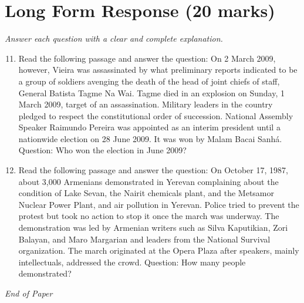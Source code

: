 \documentclass[12pt]{article}
\begin{document}
\section*{Long Form Response (20 marks)}
\textit{Answer each question with a clear and complete explanation.}
\begin{enumerate}[label=\arabic*.]
\setcounter{enumi}{10}
\item Read the following passage and answer the question: On 2 March 2009, however, Vieira was assassinated by what preliminary reports indicated to be a group of soldiers avenging the death of the head of joint chiefs of staff, General Batista Tagme Na Wai. Tagme died in an explosion on Sunday, 1 March 2009, target of an assassination. Military leaders in the country pledged to respect the constitutional order of succession. National Assembly Speaker Raimundo Pereira was appointed as an interim president until a nationwide election on 28 June 2009. It was won by Malam Bacai Sanhá. Question: Who won the election in June 2009?
\item Read the following passage and answer the question: On October 17, 1987, about 3,000 Armenians demonstrated in Yerevan complaining about the condition of Lake Sevan, the Nairit chemicals plant, and the Metsamor Nuclear Power Plant, and air pollution in Yerevan. Police tried to prevent the protest but took no action to stop it once the march was underway. The demonstration was led by Armenian writers such as Silva Kaputikian, Zori Balayan, and Maro Margarian and leaders from the National Survival organization. The march originated at the Opera Plaza after speakers, mainly intellectuals, addressed the crowd. Question: How many people demonstrated?
\end{enumerate}

\vfill
\noindent\textit{End of Paper}
\end{document}
